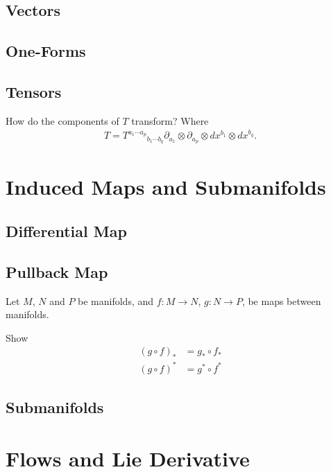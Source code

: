 \subsection{Vectors}

\subsection{One-Forms}

\subsection{Tensors}

\begin{Ebox}
  How do the components of $T$ transform? Where 
  \begin{align}
    T= T^{a_1\cdots a_p}{}_{b_1\cdots b_q} \partial_{a_1}\otimes\partial_{a_p}\otimes dx^{b_1}\otimes dx^{b_q}.
  \end{align}
\end{Ebox}

\section{Induced Maps and Submanifolds}

\subsection{Differential Map}

\subsection{Pullback Map}

\begin{Ebox}
  Let $M$, $N$ and $P$ be manifolds, and $ f:M\to N$, $g:N\to P$,  be maps between manifolds. 

  Show
  \begin{align*}
    (g\circ f)_* &= g_*\circ f_*\\
    (g\circ f)^* &= g^*\circ f^*
  \end{align*}
\end{Ebox}

\subsection{Submanifolds}

\section{Flows and Lie Derivative}

